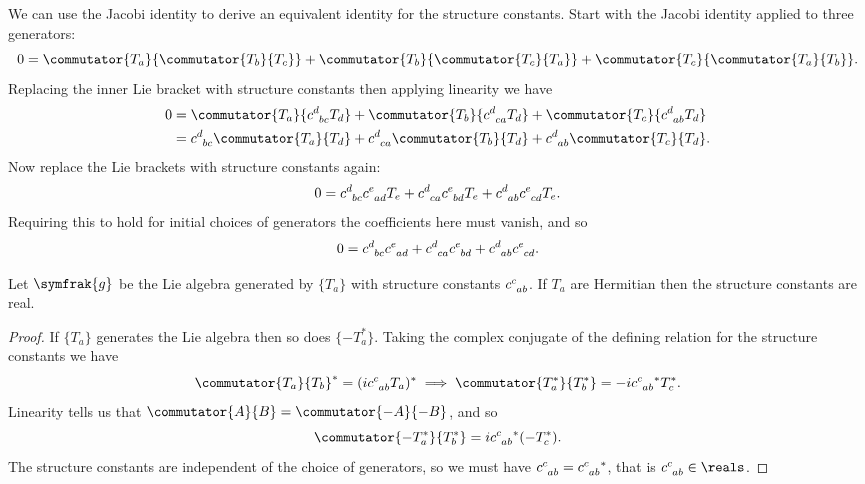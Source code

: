 \documentclass[fleqn]{NotesClass}
\renewcommand{\lie}[1]{\symfrak{#1}}
\begin{document}
    We can use the Jacobi identity to derive an equivalent identity for the structure constants.
    Start with the Jacobi identity applied to three generators:
    \begin{equation}
        0 = \commutator{T_a}{\commutator{T_b}{T_c}} + \commutator{T_b}{\commutator{T_c}{T_a}} + \commutator{T_c}{\commutator{T_a}{T_b}}.
    \end{equation}
    Replacing the inner Lie bracket with structure constants then applying linearity we have
    \begin{align}
        0 &= \commutator{T_a}{\tensor{c}{^d_{bc}}T_d} + \commutator{T_b}{\tensor{c}{^d_{ca}}T_d} + \commutator{T_c}{\tensor{c}{^d_{ab}}T_d}\\
        &= \tensor{c}{^d_{bc}}\commutator{T_a}{T_d} + \tensor{c}{^d_{ca}}\commutator{T_b}{T_d} + \tensor{c}{^d_{ab}}\commutator{T_c}{T_d}.
    \end{align}
    Now replace the Lie brackets with structure constants again:
    \begin{equation}
        0 = \tensor{c}{^d_{bc}}\tensor{c}{^e_{ad}}T_e + \tensor{c}{^d_{ca}}\tensor{c}{^e_{bd}}T_e + \tensor{c}{^d_{ab}}\tensor{c}{^e_{cd}}T_e.
    \end{equation}
    Requiring this to hold for initial choices of generators the coefficients here must vanish, and so
    \begin{equation}
        0 = \tensor{c}{^d_{bc}}\tensor{c}{^e_{ad}} + \tensor{c}{^d_{ca}}\tensor{c}{^e_{bd}} + \tensor{c}{^d_{ab}}\tensor{c}{^e_{cd}}.
    \end{equation}
    
    \begin{lma}{}{}
        Let \(\lie{g}\) be the Lie algebra generated by \(\{T_a\}\) with structure constants \(\tensor{c}{^c_{ab}}\).
        If \(T_a\) are Hermitian then the structure constants are real.
        \begin{proof}
            If \(\{T_a\}\) generates the Lie algebra then so does \(\{-T_a^*\}\).
            Taking the complex conjugate of the defining relation for the structure constants we have
            \begin{equation}
                \commutator{T_a}{T_b}^* = (i\tensor{c}{^c_{ab}}T_a)^* \implies \commutator{T_a^*}{T_b^*} = -i\tensor{c}{^c_{ab}}^*T_c^*.
            \end{equation}
            Linearity tells us that \(\commutator{A}{B} = \commutator{-A}{-B}\), and so
            \begin{equation}
                \commutator{-T_a^*}{T_b^*} = i\tensor{c}{^c_{ab}}^*(-T_c^*).
            \end{equation}
            The structure constants are independent of the choice of generators, so we must have \(\tensor{c}{^c_{ab}} = \tensor{c}{^c_{ab}}^*\), that is \(\tensor{c}{^c_{ab}} \in \reals\).
        \end{proof}
    \end{lma}
\end{document}
